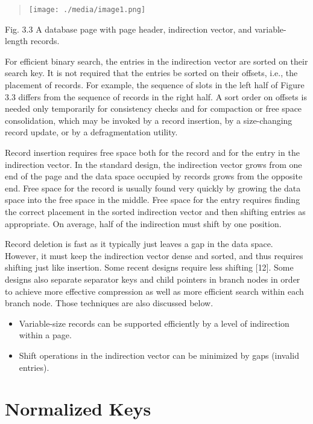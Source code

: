\begin{quote}
\texttt{[image: ./media/image1.png]}
\end{quote}

Fig. 3.3 A database page with page header, indirection vector, and
variable-length records.

For efficient binary search, the entries in the indirection vector are
sorted on their search key. It is not required that the entries be
sorted on their offsets, i.e., the placement of records. For example,
the sequence of slots in the left half of Figure 3.3 differs from the
sequence of records in the right half. A sort order on offsets is needed
only temporarily for consistency checks and for compaction or free space
consolidation, which may be invoked by a record insertion, by a
size-changing record update, or by a defragmentation utility.

Record insertion requires free space both for the record and for the
entry in the indirection vector. In the standard design, the indirection
vector grows from one end of the page and the data space occupied by
records grows from the opposite end. Free space for the record is
usually found very quickly by growing the data space into the free space
in the middle. Free space for the entry requires finding the correct
placement in the sorted indirection vector and then shifting entries as
appropriate. On average, half of the indirection must shift by one
position.

Record deletion is fast as it typically just leaves a gap in the data
space. However, it must keep the indirection vector dense and sorted,
and thus requires shifting just like insertion. Some recent designs
require less shifting {[}12{]}. Some designs also separate separator
keys and child pointers in branch nodes in order to achieve more
effective compression as well as more efficient search within each
branch node. Those techniques are also discussed below.

\begin{itemize}
\item
  Variable-size records can be supported efficiently by a level of
  indirection within a page.
\item
  Shift operations in the indirection vector can be minimized by gaps
  (invalid entries).
\end{itemize}

\hypertarget{normalized-keys}{%
\section{Normalized Keys}\label{normalized-keys}}

